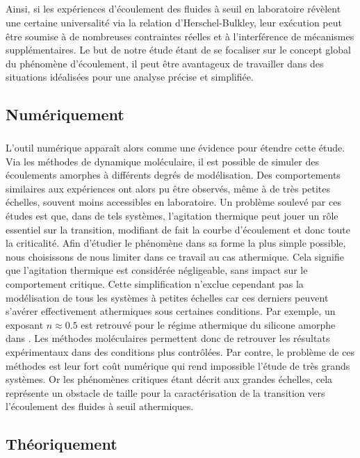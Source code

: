 \subparagraph{}Ainsi, si les expériences d'écoulement des fluides à seuil en laboratoire révèlent une certaine universalité via la relation d'Herschel-Bulkley, leur exécution peut être soumise à de nombreuses contraintes réelles et à l'interférence de mécanismes supplémentaires. Le but de notre étude étant de se focaliser sur le concept global du phénomène d’écoulement, il peut être avantageux de travailler dans des situations idéalisées pour une analyse précise et simplifiée.


\subsection{Numériquement}

\subparagraph{}L'outil numérique apparaît alors comme une évidence pour étendre cette étude. Via les méthodes de dynamique moléculaire, il est possible de simuler des écoulements amorphes à différents degrés de modélisation. Des comportements similaires aux expériences ont  alors pu être observés, même à de très petites échelles, souvent moins accessibles en laboratoire. Un problème soulevé par ces études est que, dans de tels systèmes, l'agitation thermique peut jouer un rôle essentiel sur la transition, modifiant de fait la courbe d'écoulement \cite{delbecq_rheological_2023} et donc toute la criticalité. Afin d'étudier le phénomène dans sa forme la plus simple possible, nous choisissons de nous limiter dans ce travail au cas athermique. Cela signifie que l'agitation thermique est considérée négligeable, sans impact sur le comportement critique. Cette simplification n'exclue cependant pas la modélisation de tous les systèmes à petites échelles car ces derniers peuvent s'avérer effectivement athermiques sous certaines conditions. Par exemple, un exposant $n\approx 0.5$ est retrouvé pour le régime athermique du silicone amorphe dans \cite{fusco_rheological_2014}. Les méthodes moléculaires permettent donc de retrouver les résultats expérimentaux dans des conditions plus contrôlées. Par contre, le problème de ces méthodes est leur fort coût numérique qui rend impossible l'étude de très grands systèmes. Or les phénomènes critiques étant décrit aux grandes échelles, cela représente un obstacle de taille pour la caractérisation de la transition vers l'écoulement des fluides à seuil athermiques.


\subsection{Théoriquement}


